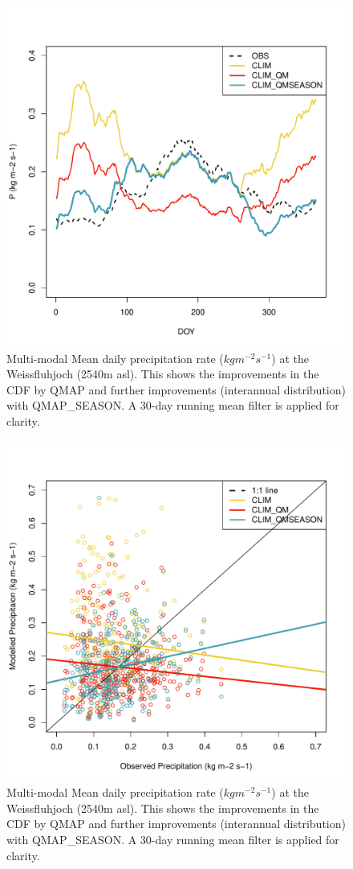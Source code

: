 \documentclass[hess, manuscript]{copernicus}
\begin{document}
\begin{figure}[t]
\includegraphics[width=12cm]{"plots/P_DOY.pdf"}
\caption{Multi-modal Mean daily precipitation rate ($kg m^{-2} s^{-1}$) at the Weissfluhjoch (2540m asl). This shows the improvements in the CDF by QMAP and further improvements (interannual distribution) with QMAP_SEASON. A 30-day running mean filter is applied for clarity. }
\end{figure}

\begin{figure}[t]
\includegraphics[width=12cm]{"plots/P_SCATTER.pdf"}
\caption{Multi-modal Mean daily precipitation rate ($kg m^{-2} s^{-1}$) at the Weissfluhjoch (2540m asl). This shows the improvements in the CDF by QMAP and further improvements (interannual distribution) with QMAP_SEASON. A 30-day running mean filter is applied for clarity. }
\end{figure}
\end{document}
